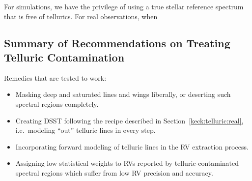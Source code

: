 For simulations, we have the privilege of using a true stellar
reference spectrum that is free of tellurics. For real observations,
when 


\subsection{Summary of Recommendations on Treating Telluric Contamination}

Remedies that are tested to work:

\begin{itemize}
  \item Masking deep and saturated lines and wings liberally, or
    deserting such spectral regions completely.
  \item Creating DSST following the recipe described in
    Section~\ref{keck:telluric:real}, i.e.\ modeling ``out'' telluric
    lines in every step. 
  \item Incorporating forward modeling of telluric lines in the RV
    extraction process.
  \item Assigning low statistical weights to RVs reported by
    telluric-contaminated spectral regions which suffer from low RV
    precision and accuracy.
\end{itemize}
